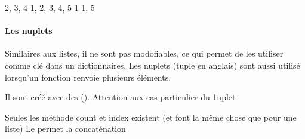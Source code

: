 \documentclass[letterpaper,10pt,english]{sphinxhowto}
\begin{document}
\begin{sphinxVerbatim}[commandchars=\\\{\}]
     
     

  
  
  
  
\end{sphinxVerbatim}

\begin{sphinxVerbatim}[commandchars=\\\{\}]
\PYGZob{}2, 3, 4\PYGZcb{}
\PYGZob{}1, 2, 3, 4, 5\PYGZcb{}
\PYGZob{}1\PYGZcb{}
\PYGZob{}1, 5\PYGZcb{}
\end{sphinxVerbatim}


\paragraph{Les n\sphinxhyphen{}uplets}
\label{\detokenize{cours3_conteneur_cours:les-n-uplets}}
\sphinxAtStartPar
Similaires aux listes, il ne sont pas modofiables, ce qui permet de les utiliser comme clé dans un dictionnaires. Les n\sphinxhyphen{}uplets (tuple en anglais) sont aussi utilisé lorsqu’un fonction renvoie plusieurs éléments.

\sphinxAtStartPar
Il sont créé avec des (). Attention aux cas particulier du 1\sphinxhyphen{}uplet

\begin{sphinxVerbatim}[commandchars=\\\{\}]
   
   
    
\end{sphinxVerbatim}

\sphinxAtStartPar
Seules les méthode count et index existent (et font la même chose que pour une liste)
Le \sphinxcode{\sphinxupquote{+}} permet la concaténation
\end{document}
